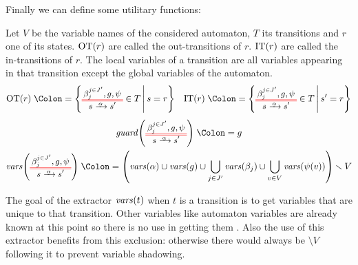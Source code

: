 \documentclass{article}
\begin{document}
Finally we can define some utilitary functions:
\begin{defi}
Let \(V\) be the variable names of the considered automaton, \(T\) its transitions and \(r\) one of its states.
\(\mathrm{OT}{\left(r\right)}\) are called the out-transitions of \(r\).
\(\mathrm{IT}{\left(r\right)}\) are called the in-transitions of \(r\).
The local variables of a transition are all variables appearing in that transition except the global variables of the automaton.
\begin{align*}
	\fOT{r} & \defnotation \mset{\OTg \in T}{s = r} &
	\fIT{r} & \defnotation \mset{\OTg \in T}{s' = r} \\
\end{align*}
\vspace{-1cm}
\begin{gather*}
	\fguard{\OTg} \defnotation g \\
	\fvars{\OTg} \defnotation \mpar{\fvars{\alpha} \cup \fvars{g} \cup \bigcup_{j \in J'} \fvars{\beta_j} \cup \bigcup_{v \in V} \fvars{\psi\mpar{v}}} \setminus V
\end{gather*}
\end{defi}

The goal of the extractor \(\mathit{vars}{\left(t\right)}\) when \(t\) is a transition is to get variables that are unique  to that transition.
Other variables like automaton variables are already known at this point so there is no use in getting them .
Also the use of this extractor benefits from this exclusion: otherwise there would always be \(\setminus V\) following it to prevent variable shadowing. 


\end{document}
